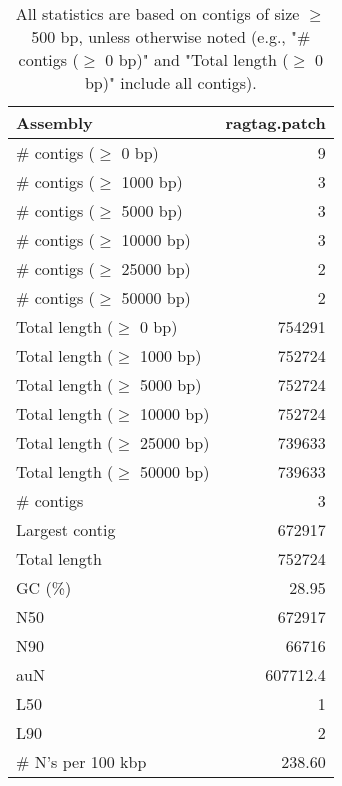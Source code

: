 \documentclass[12pt,a4paper]{article}
\begin{document}
\begin{table}[ht]
\begin{center}
\caption{All statistics are based on contigs of size $\geq$ 500 bp, unless otherwise noted (e.g., "\# contigs ($\geq$ 0 bp)" and "Total length ($\geq$ 0 bp)" include all contigs).}
\begin{tabular}{|l*{1}{|r}|}
\hline
Assembly & ragtag.patch \\ \hline
\# contigs ($\geq$ 0 bp) & 9 \\ \hline
\# contigs ($\geq$ 1000 bp) & 3 \\ \hline
\# contigs ($\geq$ 5000 bp) & 3 \\ \hline
\# contigs ($\geq$ 10000 bp) & 3 \\ \hline
\# contigs ($\geq$ 25000 bp) & 2 \\ \hline
\# contigs ($\geq$ 50000 bp) & 2 \\ \hline
Total length ($\geq$ 0 bp) & 754291 \\ \hline
Total length ($\geq$ 1000 bp) & 752724 \\ \hline
Total length ($\geq$ 5000 bp) & 752724 \\ \hline
Total length ($\geq$ 10000 bp) & 752724 \\ \hline
Total length ($\geq$ 25000 bp) & 739633 \\ \hline
Total length ($\geq$ 50000 bp) & 739633 \\ \hline
\# contigs & 3 \\ \hline
Largest contig & 672917 \\ \hline
Total length & 752724 \\ \hline
GC (\%) & 28.95 \\ \hline
N50 & 672917 \\ \hline
N90 & 66716 \\ \hline
auN & 607712.4 \\ \hline
L50 & 1 \\ \hline
L90 & 2 \\ \hline
\# N's per 100 kbp & 238.60 \\ \hline
\end{tabular}
\end{center}
\end{table}
\end{document}
